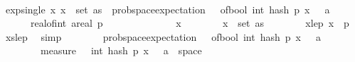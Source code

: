 \begin{isabellebody}
\isanewline
\ \ \ \ \isamarkupfalse%
\ exp{\isacharunderscore}{\kern0pt}single{\isacharcolon}{\kern0pt}\ {\isachardoublequoteopen}{\isasymAnd}x{\isachardot}{\kern0pt}\ x\ {\isasymin}\ set\ as\ {\isasymLongrightarrow}\ prob{\isacharunderscore}{\kern0pt}space{\isachardot}{\kern0pt}expectation\ {\isasymOmega}\ {\isacharparenleft}{\kern0pt}{\isasymlambda}{\isasymomega}{\isachardot}{\kern0pt}\ of{\isacharunderscore}{\kern0pt}bool\ {\isacharparenleft}{\kern0pt}int\ {\isacharparenleft}{\kern0pt}hash\ p\ x\ {\isasymomega}{\isacharparenright}{\kern0pt}\ {\isasymle}\ a{\isacharparenright}{\kern0pt}{\isacharparenright}{\kern0pt}\ {\isacharequal}{\kern0pt}\ \isanewline
\ \ \ \ \ \ {\isacharparenleft}{\kern0pt}real{\isacharunderscore}{\kern0pt}of{\isacharunderscore}{\kern0pt}int\ a{\isacharplus}{\kern0pt}{}{\isacharparenright}{\kern0pt}{\isacharslash}{\kern0pt}real\ p{\isachardoublequoteclose}\isanewline
\ \ \ \ \isamarkupfalse%
\ {\isacharminus}{\kern0pt}\isanewline
\ \ \ \ \ \ \isamarkupfalse%
\ x\isanewline
\ \ \ \ \ \ \isamarkupfalse%
\ {\isachardoublequoteopen}x\ {\isasymin}\ set\ as{\isachardoublequoteclose}\isanewline
\ \ \ \ \ \ \isamarkupfalse%
\ x{\isacharunderscore}{\kern0pt}le{\isacharunderscore}{\kern0pt}p{\isacharcolon}{\kern0pt}\ {\isachardoublequoteopen}x\ {\isacharless}{\kern0pt}\ p{\isachardoublequoteclose}\ \isamarkupfalse%
\ xs{\isacharunderscore}{\kern0pt}le{\isacharunderscore}{\kern0pt}p\ \isamarkupfalse%
\ simp\isanewline
\ \ \ \ \ \ \isamarkupfalse%
\ {\isachardoublequoteopen}prob{\isacharunderscore}{\kern0pt}space{\isachardot}{\kern0pt}expectation\ {\isasymOmega}\ {\isacharparenleft}{\kern0pt}{\isasymlambda}{\isasymomega}{\isachardot}{\kern0pt}\ of{\isacharunderscore}{\kern0pt}bool\ {\isacharparenleft}{\kern0pt}int\ {\isacharparenleft}{\kern0pt}hash\ p\ x\ {\isasymomega}{\isacharparenright}{\kern0pt}\ {\isasymle}\ a{\isacharparenright}{\kern0pt}{\isacharparenright}{\kern0pt}\ {\isacharequal}{\kern0pt}\ \isanewline
\ \ \ \ \ \ \ \ measure\ {\isasymOmega}\ {\isacharparenleft}{\kern0pt}{\isacharbraceleft}{\kern0pt}{\isasymomega}{\isachardot}{\kern0pt}\ int\ {\isacharparenleft}{\kern0pt}hash\ p\ x\ {\isasymomega}{\isacharparenright}{\kern0pt}\ {\isasymle}\ a{\isacharbraceright}{\kern0pt}\ {\isasyminter}\ space\ {\isasymOmega}\isanewline
\ \ \ \ \ \ \ \ \isamarkupfalse%

\end{isabellebody}
